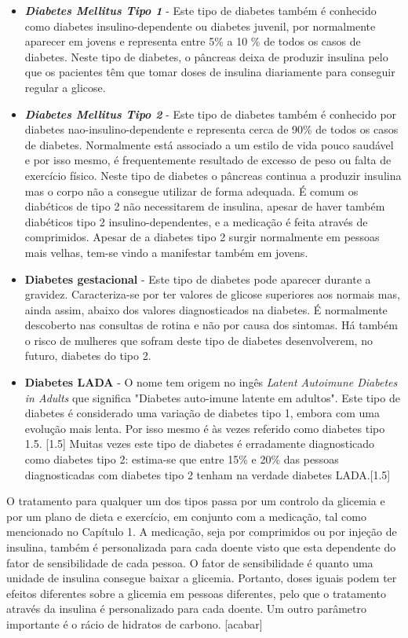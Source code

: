 \begin{itemize}
\item \textit{\textbf{Diabetes Mellitus Tipo 1}} - 
Este tipo de diabetes também é conhecido como diabetes insulino-dependente ou diabetes juvenil, por normalmente aparecer em jovens e representa entre 5\% a 10 \% de todos os casos de diabetes. 
Neste tipo de diabetes, o pâncreas deixa de produzir insulina pelo que os pacientes têm que tomar doses de insulina diariamente para conseguir regular a glicose.

\item \textit{\textbf{Diabetes Mellitus Tipo 2}} - 
Este tipo de diabetes também é conhecido por diabetes nao-insulino-dependente e representa cerca de 90\% de todos os casos de diabetes. Normalmente está associado a um estilo de vida pouco saudável e por isso mesmo, é frequentemente resultado de excesso de peso ou falta de exercício físico. 
Neste tipo de diabetes o pâncreas continua a produzir insulina mas o corpo não a consegue utilizar de forma adequada.  É comum os diabéticos de tipo 2 não necessitarem de insulina, apesar de haver também diabéticos tipo 2 insulino-dependentes, e a medicação é feita através de comprimidos. Apesar de a diabetes tipo 2 surgir normalmente em pessoas mais velhas, tem-se vindo a manifestar também em jovens.

\item {\textbf{Diabetes gestacional}} - 
Este tipo de diabetes pode aparecer durante a gravidez. Caracteriza-se por ter valores de glicose superiores aos normais mas, ainda assim, abaixo dos valores diagnosticados na diabetes.
É normalmente descoberto nas consultas de rotina e não por causa dos sintomas. Há também o risco de mulheres que sofram deste tipo de diabetes desenvolverem, no futuro, diabetes do tipo 2.

\item {\textbf{Diabetes LADA}} - 
O nome tem origem no ingês \textit{Latent Autoimune Diabetes in Adults} que significa "Diabetes auto-imune latente em adultos". 
Este tipo de diabetes é considerado uma variação de diabetes tipo 1, embora com uma evolução mais lenta. Por isso mesmo é às vezes referido como diabetes tipo 1.5. [1.5] Muitas vezes este tipo de diabetes é erradamente diagnosticado como diabetes tipo 2: estima-se que entre 15\% e 20\% das pessoas diagnosticadas com diabetes tipo 2 tenham na verdade diabetes LADA.[1.5]
\end{itemize}

O tratamento para qualquer um dos tipos passa por um controlo da glicemia e por um plano de dieta e exercício, em conjunto com a medicação, tal como mencionado no Capítulo 1. A medicação, seja por comprimidos ou por injeção de insulina, também é personalizada para cada doente visto que esta dependente do fator de sensibilidade de cada pessoa.
O fator de sensibilidade é quanto uma unidade de insulina consegue baixar a glicemia. Portanto, doses iguais podem ter efeitos diferentes sobre a glicemia em pessoas diferentes, pelo que o tratamento através da insulina é personalizado para cada doente.
Um outro parâmetro importante é o rácio de hidratos de carbono. [acabar]

